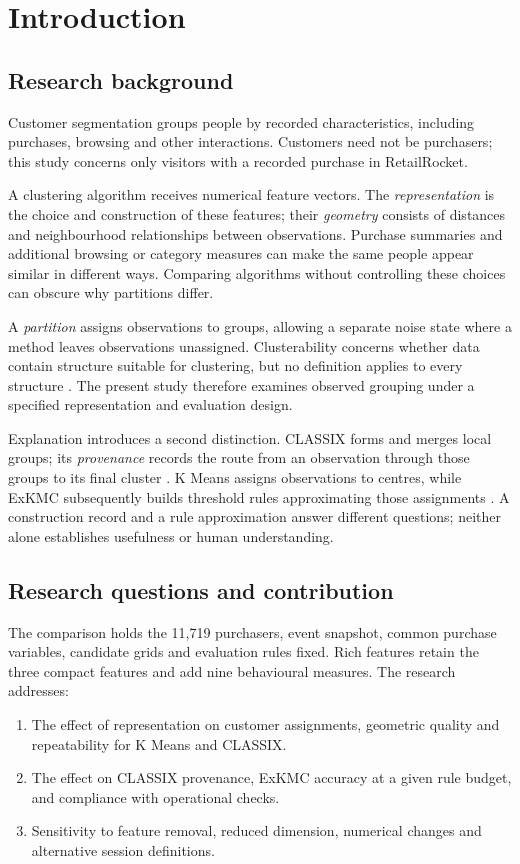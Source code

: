 \chapter{Introduction}

\section{Research background}

Customer segmentation groups people by recorded characteristics, including purchases, browsing and other interactions. Customers need not be purchasers; this study concerns only visitors with a recorded purchase in RetailRocket.

A clustering algorithm receives numerical feature vectors. The \emph{representation} is the choice and construction of these features; their \emph{geometry} consists of distances and neighbourhood relationships between observations. Purchase summaries and additional browsing or category measures can make the same people appear similar in different ways. Comparing algorithms without controlling these choices can obscure why partitions differ.

A \emph{partition} assigns observations to groups, allowing a separate noise state where a method leaves observations unassigned. Clusterability concerns whether data contain structure suitable for clustering, but no definition applies to every structure \citep{ackerman2009clusterability,adolfsson2019clusterability}. The present study therefore examines observed grouping under a specified representation and evaluation design.

Explanation introduces a second distinction. CLASSIX forms and merges local groups; its \emph{provenance} records the route from an observation through those groups to its final cluster \citep{chen2024classix}. K Means assigns observations to centres, while ExKMC subsequently builds threshold rules approximating those assignments \citep{frost2020exkmc}. A construction record and a rule approximation answer different questions; neither alone establishes usefulness or human understanding.

\section{Research questions and contribution}

The comparison holds the 11,719 purchasers, event snapshot, common purchase variables, candidate grids and evaluation rules fixed. Rich features retain the three compact features and add nine behavioural measures. The research addresses:
\begin{enumerate}
\item The effect of representation on customer assignments, geometric quality and repeatability for K Means and CLASSIX.
\item The effect on CLASSIX provenance, ExKMC accuracy at a given rule budget, and compliance with operational checks.
\item Sensitivity to feature removal, reduced dimension, numerical changes and alternative session definitions.
\end{enumerate}

